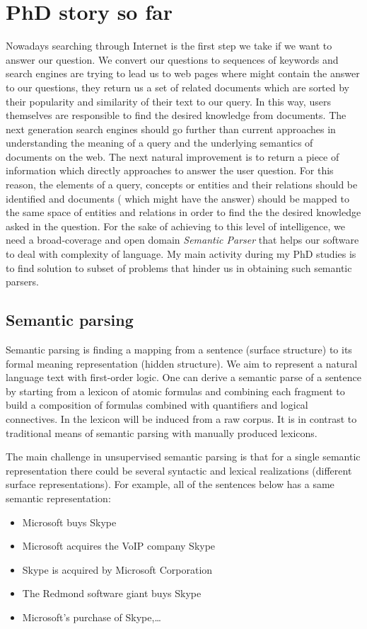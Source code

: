 \chapter{PhD story so far}
Nowadays searching through Internet is the first step we take if we want to
answer our question.
We convert our questions to sequences of keywords and search engines are trying 
to lead us to web pages where might contain the answer to our questions, they return us a set of related
documents which are sorted by their popularity and similarity of their text to our query.
In this way, users themselves are responsible to find the desired knowledge 
from documents. The next generation search engines should go further than current 
approaches in understanding the meaning of a query and the underlying semantics of documents on 
the web. The next natural improvement is to return a piece of information which directly approaches to 
answer the user question. For this reason, the elements of a query, concepts or entities and 
their relations should be identified and documents ( which might have the answer) should be mapped to the 
same space of entities and relations in order to find the the desired knowledge
asked in the question. For the sake of achieving to this level of intelligence,
we need a broad-coverage and open domain \emph{Semantic Parser} that helps our
software to deal with complexity of language. My main activity during my PhD
studies is to find solution to subset of problems that hinder us in obtaining
such semantic parsers.

\section{Semantic parsing}
\label{sec:usp-sem-parse}

Semantic parsing is finding a mapping from a sentence (surface structure) to its
formal meaning representation (hidden structure).
We aim to represent a natural language text with first-order logic. One can derive
a semantic parse of a sentence by starting from a lexicon of atomic formulas and combining each fragment to build a composition of formulas combined with quantifiers and logical connectives. In \citep{Poon2009} the lexicon will be induced from a raw corpus. It is in contrast to traditional means of semantic parsing with manually
  produced lexicons.
  
  The main challenge in unsupervised semantic parsing is that for a single semantic representation there could be
  several syntactic and lexical realizations (different surface
  representations). For example, all of the sentences below has a same semantic
  representation:
   \begin{itemize}
     \item Microsoft buys Skype
     \item Microsoft acquires the VoIP company Skype
     \item Skype is acquired by Microsoft Corporation
     \item The Redmond software giant buys Skype
     \item Microsoft’s purchase of Skype,\ldots
   \end{itemize}  
  
